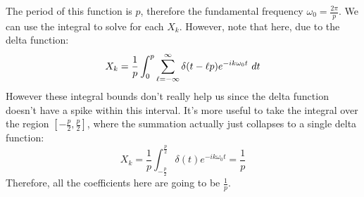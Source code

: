 \documentclass[10pt]{article}
\begin{document}
\begin{enumerate}[label=\alph*)]
			\begin{solution}
				The period of this function is \( p \), therefore the fundamental frequency 
				\( \omega_0 = \frac{2\pi}{p} \). We can use the integral to solve for each \( X_k \). However, 
				note that here, due to the delta function:
				\[
				X_k = \frac{1}{p} 
				\int_{0}^{p} \sum_{\ell=-\infty}^{\infty} \delta(t - \ell p) e^{-i k\omega_0 t} \ d t
				\] 
				However these integral bounds don't really help us since the delta function doesn't have a spike 
				within this interval. It's more useful to take the integral over the region
				\( [-\frac{p}{2}, \frac{p}{2}] \), where the summation actually just collapses to a single 
				delta function:
				\[
				X_k = \frac{1}{p} \int_{-\frac{p}{2}}^{\frac{p}{2}} \delta(t) e^{- i k \omega_0 t} =  \frac{1}{p}
				\] 
				Therefore, all the coefficients here are going to be \( \frac{1}{p} \). 
			\end{solution}
	\end{enumerate}
	\pagebreak
\end{document}
